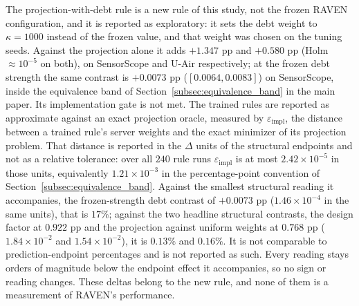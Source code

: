 \documentclass[letterpaper,journal]{IEEEtran}
\begin{document}
The projection-with-debt rule is a new rule of this study, not the frozen RAVEN
configuration, and it is reported as exploratory: it sets the debt weight to
$\kappa=1000$ instead of the frozen value, and that weight was chosen on the
tuning seeds.  Against the projection alone it adds $+1.347$ pp and $+0.580$ pp
(Holm $\approx10^{-5}$ on both), on SensorScope and U-Air respectively; at the
frozen debt strength the same contrast is $+0.0073$ pp ($[0.0064,0.0083]$) on
SensorScope, inside the equivalence band of
Section~\ref{subsec:equivalence_band} in the main paper.  Its implementation
gate is not met.  The trained rules are reported as approximate against an exact
projection oracle, measured by $\varepsilon_{\mathrm{impl}}$, the distance
between a trained rule's server weights and the exact minimizer of its
projection problem.  That distance is reported in the $\Delta$ units of
the structural endpoints and not as a relative tolerance: over all $240$ rule
runs $\varepsilon_{\mathrm{impl}}$ is at most $2.42\times10^{-5}$ in those units,
equivalently $1.21\times10^{-3}$ in the percentage-point convention of
Section~\ref{subsec:equivalence_band}.  Against the smallest structural reading
it accompanies, the frozen-strength debt contrast of $+0.0073$ pp
($1.46\times10^{-4}$ in the same units), that is $17\%$; against the two headline
structural contrasts, the design factor at $0.922$ pp and the projection against
uniform weights at $0.768$ pp ($1.84\times10^{-2}$ and $1.54\times10^{-2}$), it is
$0.13\%$ and $0.16\%$.  It is not comparable to
prediction-endpoint percentages and is not reported as such.  Every reading
stays orders of magnitude below the endpoint effect it accompanies, so no sign
or reading changes.  These deltas belong to the new rule, and none of them is a
measurement of RAVEN's performance.



\end{document}
